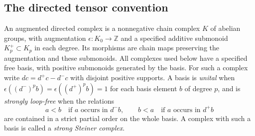 \subsection{The directed tensor convention}

An augmented directed complex is a nonnegative chain complex $K$ of
abelian groups, with augmentation $\epsilon:K_0\to\mathbb Z$ and a
specified additive submonoid $K_p^+\subset K_p$ in each degree.
Its morphisms are chain maps preserving the augmentation and these
submonoids.  All complexes used below have a specified free basis, with
positive submonoids generated by the basis.  For such a complex write
$dc=d^+c-d^-c$ with disjoint positive supports.  A basis is
\emph{unital} when
$\epsilon((d^-)^p b)=\epsilon((d^+)^p b)=1$ for each basis element
$b$ of degree $p$, and is \emph{strongly loop-free} when the relations
\[
 a<b\quad\text{if }a\text{ occurs in }d^-b,
 \qquad
 b<a\quad\text{if }a\text{ occurs in }d^+b
\]
are contained in a strict partial order on the whole basis.
A complex with such a basis is called a \emph{strong Steiner complex}.

